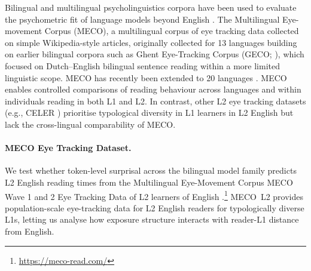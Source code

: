
Bilingual and multilingual psycholinguistics corpora have been used to evaluate the psychometric fit of language models beyond English \citep{de-varda-marelli-2023-scaling, wilcox2023language, xu2023linearity}. The Multilingual Eye-movement Corpus (MECO), a multilingual corpus of eye tracking data collected on simple Wikipedia-style articles, originally collected for 13 languages \cite{siegelman2022expanding} building on earlier bilingual corpora such as Ghent Eye-Tracking Corpus (GECO; \citealp{colman-etal-2022-geco}), which focused on Dutch–English bilingual sentence reading within a more limited linguistic scope. MECO has recently been extended to 20 languages \cite{siegelman2025wave}. MECO enables controlled comparisons of reading behaviour across languages and within individuals reading in both L1 and L2. In contrast, other L2 eye tracking datasets (e.g., CELER \cite{berzak2022celer}) prioritise typological diversity in L1 learners in L2 English but lack the cross-lingual comparability of MECO. 

\paragraph{MECO Eye Tracking Dataset.} We test whether token-level surprisal across the \beetle{} bilingual model family predicts L2 English reading times from the Multilingual Eye-Movement Corpus  MECO Wave 1 and 2 Eye Tracking Data of L2 learners of English \citep{siegelman2022expanding, kuperman2023text,siegelman2025wave,kuperman2025new}.\footnote{\url{https://meco-read.com/}} MECO~L2 provides population-scale eye-tracking data for L2 English readers for typologically diverse L1s, letting us analyse how exposure structure interacts with reader-L1 distance from English.  

